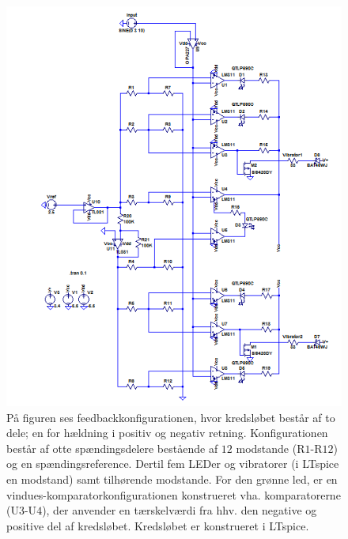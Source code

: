 \begin{figure}[H] 
	\centering
	\includegraphics[scale=0.9]{figures/cProblemloesning/komparator_uden_vaerdi.PNG}
	\caption{På figuren ses feedbackkonfigurationen, hvor kredsløbet består af to dele; en for hældning i positiv og negativ retning. Konfigurationen består af otte spændingsdelere bestående af $12$ modstande (R$1$-R$12$) og en spændingsreference. Dertil fem LEDer og vibratorer (i LTspice en modstand) samt tilhørende modstande. For den grønne led, er en vindues-komparatorkonfigurationen  konstrueret vha. komparatorerne (U$3$-U$4$), der anvender en tærskelværdi fra hhv. den negative og positive del af kredsløbet. Kredsløbet er konstrueret i LTspice.}
	\label{fig:komparator_uden_vaerdi}
\end{figure}


